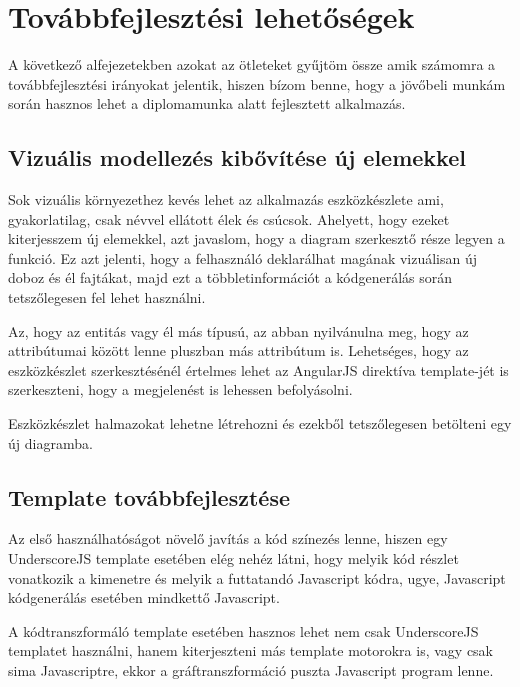 
\section{Továbbfejlesztési lehetőségek}

A következő alfejezetekben azokat az ötleteket gyűjtöm össze amik számomra a továbbfejlesztési irányokat jelentik, hiszen bízom benne, hogy a jövőbeli munkám során hasznos lehet a diplomamunka alatt fejlesztett alkalmazás.

\subsection{Vizuális modellezés kibővítése új elemekkel}

Sok vizuális környezethez kevés lehet az alkalmazás eszközkészlete ami, gyakorlatilag, csak névvel ellátott élek és csúcsok.
Ahelyett, hogy ezeket kiterjesszem új elemekkel, azt javaslom, hogy a diagram szerkesztő része legyen a funkció. Ez azt jelenti, hogy a felhasználó deklarálhat magának vizuálisan új doboz és él fajtákat, majd ezt a többletinformációt a kódgenerálás során tetszőlegesen fel lehet használni.

Az, hogy az entitás vagy él más típusú, az abban nyilvánulna meg, hogy az attribútumai között lenne pluszban más attribútum is. Lehetséges, hogy az eszközkészlet szerkesztésénél értelmes lehet az AngularJS direktíva template-jét is szerkeszteni, hogy a megjelenést is lehessen befolyásolni. 

Eszközkészlet halmazokat lehetne létrehozni és ezekből tetszőlegesen betölteni egy új diagramba.


\subsection{Template továbbfejlesztése}

Az első használhatóságot növelő javítás a kód színezés lenne, hiszen egy UnderscoreJS template esetében elég nehéz látni, hogy melyik kód részlet vonatkozik a kimenetre és melyik a futtatandó Javascript kódra, ugye, Javascript kódgenerálás esetében mindkettő Javascript. 

A kódtranszformáló template esetében hasznos lehet nem csak UnderscoreJS templatet használni, hanem kiterjeszteni más template motorokra is, vagy csak sima Javascriptre, ekkor a gráftranszformáció puszta Javascript program lenne.

